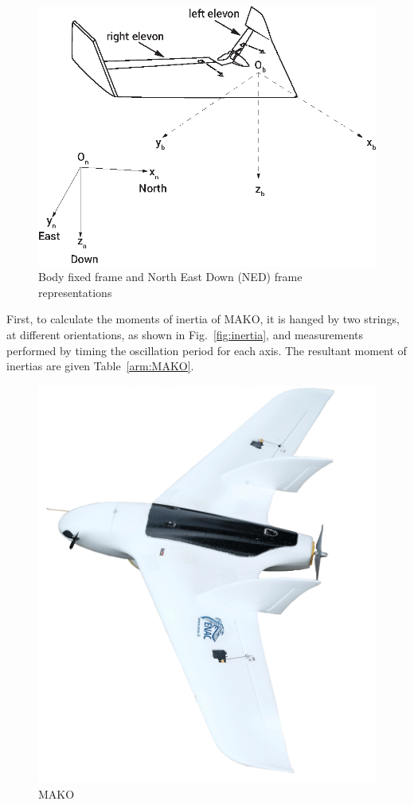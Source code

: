 \begin{figure}
\begin{center}
\includegraphics[width=13cm]{figures/ZagiElevon}    %
\caption{Body fixed frame and North East Down (NED) frame representations} 
\label{fig:bodyNEDframes}
\end{center}
\end{figure}

First, to calculate the moments of inertia of MAKO, it is hanged by two strings, at different orientations, as shown in Fig.~\ref{fig:inertia}, and measurements performed by timing the oscillation period for each axis. 
The resultant moment of inertias are given Table~\ref{arm:MAKO}. 

\begin{figure}
\centering
\includegraphics[width=0.7\columnwidth]{figures/makoEmptyBack}
\caption{MAKO}
\label{figure:mako}
\end{figure}

